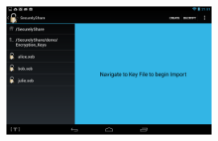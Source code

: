 \begin{figure}[h!]
    \centering
    \includegraphics[width=0.6\textwidth]{import}                                                                                                                                                                                                                                                                                                                                                                                                                                                                                                                                                                                                                                                                                                                                                                                                                                                                                                                                                                                                                                                                                                                                                                                                                                                                                                                                                                                                                                                                                                                                                                                                                                                                                                                                                                                                                                                                                                                                                                                                                                                                                                                                                                                                                                                                                                                                                                                                                                                                                                                                                                                                                                                                                                                                                               
\end{figure}
